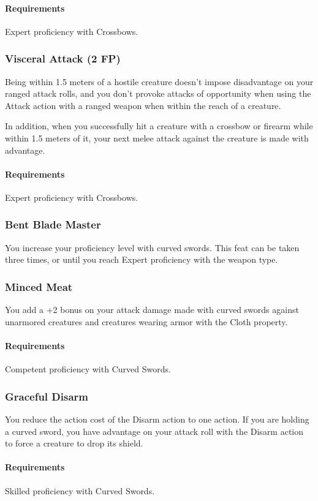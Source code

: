     \paragraph{Requirements} Expert proficiency with Crossbows.
\subsubsection{Visceral Attack (2 FP)} \label{feat::visceralattack}
    Being within 1.5 meters of a hostile creature doesn't impose disadvantage on your ranged attack rolls, and you don't provoke attacks of opportunity when using the Attack action with a ranged weapon when within the reach of a creature.

    In addition, when you successfully hit a creature with a crossbow or firearm while within 1.5 meters of it, your next melee attack against the creature is made with advantage.
    \paragraph{Requirements} Expert proficiency with Crossbows.
\subsubsection{Bent Blade Master} \label{feat::bentblademaster}
    You increase your proficiency level with curved swords.
    This feat can be taken three times, or until you reach Expert proficiency with the weapon type.
\subsubsection{Minced Meat} \label{feat::mincedmeat}
    You add a +2 bonus on your attack damage made with curved swords against unarmored creatures and creatures wearing armor with the Cloth property.
    \paragraph{Requirements} Competent proficiency with Curved Swords.
\subsubsection{Graceful Disarm} \label{feat::gracefuldisarm}
    You reduce the action cost of the Disarm action to one action.
    If you are holding a curved sword, you have advantage on your attack roll with the Disarm action to force a creature to drop its shield.
    \paragraph{Requirements} Skilled proficiency with Curved Swords.
